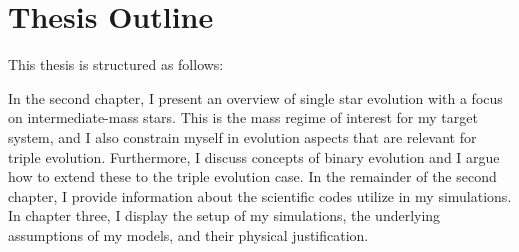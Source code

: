 \section{Thesis Outline}

This thesis is structured as follows: 

In the second chapter, I present an overview of single star evolution with a focus on intermediate-mass stars. This is the mass regime of interest for my target system, and I also constrain myself in evolution aspects that are relevant for triple evolution. Furthermore, I discuss concepts of binary evolution and I argue how to extend these to the triple evolution case. In the remainder of the second chapter, I provide information about the scientific codes utilize in my simulations. In chapter three, I display the setup of my simulations, the underlying assumptions of my models, and their physical justification.



